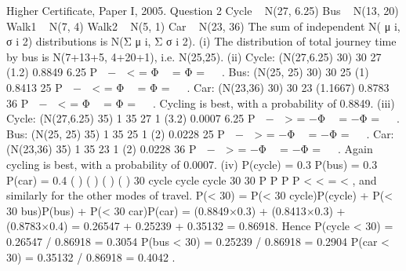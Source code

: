 \documentclass[a4paper,12pt]{article}
\begin{document}
Higher Certificate, Paper I, 2005. Question 2
Cycle ~ N(27, 6.25)
Bus ~ N(13, 20) Walk1 ~ N(7, 4) Walk2 ~ N(5, 1)
Car ~ N(23, 36)
The sum of independent N( μ
i, σ
i 2) distributions is N(Σ μ
i, Σ σ
i 2).
(i) The distribution of total journey time by bus is N(7+13+5, 4+20+1), i.e. N(25,25).
(ii) Cycle: (N(27,6.25) 30) 30 27 (1.2) 0.8849
6.25
P  −  < = Φ  = Φ =
 
.
Bus: (N(25, 25) 30) 30 25 (1) 0.8413
25
P  −  < = Φ  = Φ =
 
.
Car: (N(23,36) 30) 30 23 (1.1667) 0.8783
36
P  −  < = Φ  = Φ =
 
.
Cycling is best, with a probability of 0.8849.
(iii) Cycle: (N(27,6.25) 35) 1 35 27 1 (3.2) 0.0007
6.25
P  −  > = −Φ  = −Φ =
 
.
Bus: (N(25, 25) 35) 1 35 25 1 (2) 0.0228
25
P  −  > = −Φ  = −Φ =
 
.
Car: (N(23,36) 35) 1 35 23 1 (2) 0.0228
36
P  −  > = −Φ  = −Φ =
 
.
Again cycling is best, with a probability of 0.0007.
(iv) P(cycle) = 0.3 P(bus) = 0.3 P(car) = 0.4
( ) ( ) ( )
( )
30 cycle cycle
cycle 30
30
P P
P
P
<
< =
<
, and similarly for the other modes of travel.
P(< 30) = P(< 30 cycle)P(cycle) + P(< 30 bus)P(bus) + P(< 30 car)P(car)
= (0.8849×0.3) + (0.8413×0.3) + (0.8783×0.4)
= 0.26547 + 0.25239 + 0.35132 = 0.86918.
Hence P(cycle < 30) = 0.26547 / 0.86918 = 0.3054
P(bus < 30) = 0.25239 / 0.86918 = 0.2904
P(car < 30) = 0.35132 / 0.86918 = 0.4042 .
\end{document}
